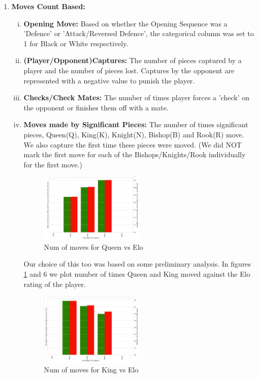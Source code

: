 \documentclass[11pt,a4paper]{article}
\begin{document}
\begin{enumerate}[I]
    \item \textbf{Moves Count Based:}
\begin{enumerate}[(i)]
    \item \textbf{Opening Move:} Based on whether the Opening Sequence was a 'Defence' or 'Attack/Reversed Defence', the categorical column was set to 1 for Black or White respectively.
    \item \textbf{(Player/Opponent)Captures:} The number of pieces captured by a player and the number of pieces lost. Captures by the opponent are represented with a negative value to punish the player.
    \item \textbf{Checks/Check Mates:} The number of times player forces a 'check' on the opponent or finishes them off with a mate.
    \item \textbf{Moves made by Significant Pieces:} The number of times significant pieces, Queen(Q), King(K), Knight(N), Bishop(B) and Rook(R) move. We also capture the first time these pieces were moved. (We did NOT mark the first move for each of the Bishops/Knights/Rook individually for the first move.)
    \begin{figure}[!ht]
      \includegraphics[width=0.5\textwidth]{QueenMovNum.png}
      \caption{Num of moves for Queen vs Elo}
      \label{fig:Queen}
        
    \end{figure}
    
    Our choice of this too was based on some preliminary analysis. In figures \ref{fig:Queen} and 6 we plot number of times Queen and King moved against the Elo rating of the player.\\
    \begin{figure}[!ht]
        \includegraphics[width=0.5\textwidth]{KingMoveNum.png}
        \caption{Num of moves for King vs Elo}
        \label{fig:King}
    \end{figure}
    

\end{enumerate}
\end{enumerate}
\end{document}
